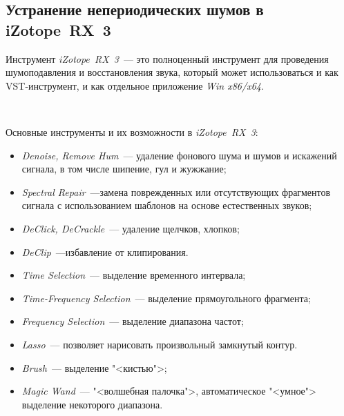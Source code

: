 \documentclass{beamer}
\begin{document}
\subsection{Устранение непериодических шумов в iZotope~RX~3}
\begin{frame}
Инструмент \emph{iZotope~RX~3}~--- это полноценный инструмент для проведения шумоподавления и восстановления звука, который может использоваться и как VST-инструмент, и как отдельное приложение \emph{Win x86/x64}.

~

Основные инструменты и их возможности в \emph{iZotope~RX~3}:
\begin{itemize}
  \item \emph{Denoise, Remove Hum}~--- удаление фонового шума и шумов и искажений сигнала, в том числе шипение, гул и жужжание;
  \item \emph{Spectral Repair}~---замена поврежденных или отсутствующих фрагментов сигнала с использованием шаблонов на основе естественных звуков;
  \item \emph{DeClick, DeCrackle}~--- удаление щелчков, хлопков;
  \item \emph{DeClip}~---избавление от клипирования.
\end{itemize}
\end{frame}

\begin{frame}
\begin{itemize}
  \item \emph{Time Selection}~--- выделение временного интервала;
  \item \emph{Time-Frequency Selection}~--- выделение прямоугольного фрагмента;
  \item \emph{Frequency Selection}~--- выделение диапазона частот;
  \item \emph{Lasso}~--- позволяет нарисовать произвольный замкнутый контур.
  \item \emph{Brush}~--- выделение "<кистью">;
  \item \emph{Magic Wand}~--- "<волшебная палочка">, автоматическое "<умное"> выделение некоторого диапазона.
\end{itemize}
\end{frame}
\end{document}
